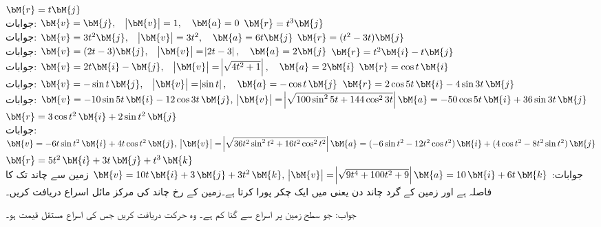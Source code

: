 \quad
$\bM{r}=t\bM{j}$\\
جوابات:
$\bM{v}=\bM{j},\quad \abs{\bM{v}}=1,\quad \bM{a}=0$
\quad
$\bM{r}=t^3\bM{j}$\\
جوابات:
$\bM{v}=3t^2\bM{j},\quad \abs{\bM{v}}=3t^2,\quad \bM{a}=6t\bM{j}$
\quad
$\bM{r}=(t^2-3t)\bM{j}$\\
جوابات:
$\bM{v}=(2t-3)\bM{j},\quad \abs{\bM{v}}=\abs{2t-3},\quad \bM{a}=2\bM{j}$
\quad
$\bM{r}=t^2\bM{i}-t\bM{j}$\\
جوابات:
$\bM{v}=2t\bM{i}-\bM{j},\quad \abs{\bM{v}}=\abs{\sqrt{4t^2+1}},\quad \bM{a}=2\bM{i}$
\quad
$\bM{r}=\cos t \,\bM{i}$\\
جوابات:
$\bM{v}=-\sin t\, \bM{j},\quad \abs{\bM{v}}=\abs{\sin t},\quad \bM{a}=-\cos t\,\bM{j}$
\quad
$\bM{r}=2\cos 5t \,\bM{i}-4\sin 3t \,\bM{j}$\\
جوابات:
$\bM{v}=-10\sin 5t\, \bM{i}-12\cos 3t\,\bM{j},\,\,\abs{\bM{v}}=\abs{\sqrt{100\sin^2 5t+144\cos^2 3t}}\\ \bM{a}=-50\cos 5t\,\bM{i}+36\sin 3t \,\bM{j}$
\quad
$\bM{r}=3\cos t^2 \,\bM{i}+2\sin t^2 \,\bM{j}$\\
جوابات:
$\bM{v}=-6t\sin t^2\, \bM{i}+4t\cos t^2\,\bM{j},\,\,\abs{\bM{v}}=\abs{\sqrt{36t^2\sin^2 t^2+16t^2\cos^2 t^2}}\\ 
\bM{a}=(-6\sin t^2-12t^2\cos t^2)\,\bM{i}+(4\cos t^2-8t^2\sin t^2) \,\bM{j}$
\quad
$\bM{r}=5t^2 \,\bM{i}+3t \,\bM{j}+t^3\,\bM{k}$\\
جوابات:
$\bM{v}=10t\, \bM{i}+3\,\bM{j}+3t^2\,\bM{k},\,\,\abs{\bM{v}}=\abs{\sqrt{9t^4+100t^2+9}}\\ 
\bM{a}=10\,\bM{i}+6t \,\bM{k}$
زمین سے چاند تک کا فاصلہ  ہے اور زمین کے گرد چاند  دن یعنی  میں ایک چکر پورا کرتا ہے۔زمین کے رخ چاند کی مرکز مائل اسراع دریافت کریں۔

جواب: جو سطح زمین پر اسراع  سے  گنا کم ہے۔ 
وہ حرکت دریافت کریں جس کی اسراع مستقل قیمت ہو۔


